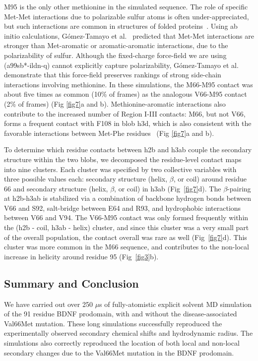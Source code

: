 \documentclass[10pt,letterpaper]{article}
\begin{document}
M95 is the only other methionine in the simulated sequence. The role of specific Met-Met interactions due to polarizable sulfur atoms is often under-appreciated, but such interactions are common in structures of folded proteins~\cite{Faure2008}. Using ab initio calculations, G\'omez-Tamayo et al.~\cite{Gomez-Tamayo2016} predicted that Met-Met interactions are stronger than Met-aromatic or aromatic-aromatic interactions, due to the polarizability of sulfur. Although the fixed-charge force-field we are using (a99sb*-ildn-q) cannot explicitly capture polarizability, G\'omez-Tamayo et al. demonstrate that this force-field preserves rankings of strong side-chain interactions involving methionine. In these simulations, the M66-M95 contact was about five times as common (10\% of frames) as the analogous V66-M95 contact (2\% of frames) (Fig \ref{fig7}a and b). Methionine-aromatic interactions also contribute to the increased number of Region I-III contacts: M66, but not V66, forms a frequent contact with F108 in blob h3d, which is also consistent with the favorable interactions between Met-Phe residues~\cite{Viguera1995,Faure2008,Valley2012} (Fig \ref{fig7}a and b). 

To determine which residue contacts between h2b and h3ab couple the secondary structure within the two blobs, we decomposed the residue-level contact maps into nine clusters. Each cluster was specified by two collective variables with three possible values each: secondary structure (helix, $\beta$, or coil) around residue 66 and secondary structure (helix, $\beta$, or coil) in h3ab (Fig~\ref{fig7}d). The $\beta$-pairing at h2b-h3ab is stabilized via a combination of backbone hydrogen bonds between V66 and S92, salt-bridge between E64 and R93, and hydrophobic interactions between V66 and V94. The V66-M95 contact was only formed frequently within the (h2b - coil, h3ab - helix) cluster, and since this cluster was a very small part of the overall population, the contact overall was rare as well (Fig~\ref{fig7}d). This cluster was more common in the M66 sequence, and contributes to the non-local increase in helicity around residue 95 (Fig~\ref{fig3}b).


\subsection*{Summary and Conclusion}

We have carried out over 250 $\mu$s of fully-atomistic explicit solvent MD simulation of the 91 residue BDNF prodomain, with and without the disease-associated Val66Met mutation. These long simulations successfully reproduced the experimentally observed secondary chemical shifts and hydrodynamic radius. The simulations also correctly reproduced the location of both local and non-local secondary changes due to the Val66Met mutation in the BDNF prodomain. 
\end{document}
